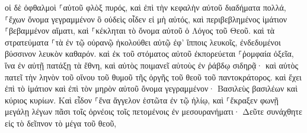 \documentclass{openreader}
\begin{document}
οἱ δὲ ὀφθαλμοὶ ⸀αὐτοῦ φλὸξ πυρός, καὶ ἐπὶ τὴν κεφαλὴν αὐτοῦ διαδήματα πολλά, ⸀ἔχων ὄνομα γεγραμμένον ὃ οὐδεὶς οἶδεν εἰ μὴ αὐτός, 
καὶ περιβεβλημένος ἱμάτιον ⸀βεβαμμένον αἵματι, καὶ ⸀κέκληται τὸ ὄνομα αὐτοῦ ὁ Λόγος τοῦ Θεοῦ. 
καὶ τὰ στρατεύματα ⸀τὰ ἐν τῷ οὐρανῷ ἠκολούθει αὐτῷ ἐφ’ ἵπποις λευκοῖς, ἐνδεδυμένοι βύσσινον λευκὸν καθαρόν. 
καὶ ἐκ τοῦ στόματος αὐτοῦ ἐκπορεύεται ⸀ῥομφαία ὀξεῖα, ἵνα ἐν αὐτῇ πατάξῃ τὰ ἔθνη, καὶ αὐτὸς ποιμανεῖ αὐτοὺς ἐν ῥάβδῳ σιδηρᾷ· καὶ αὐτὸς πατεῖ τὴν ληνὸν τοῦ οἴνου τοῦ θυμοῦ τῆς ὀργῆς τοῦ θεοῦ τοῦ παντοκράτορος. 
καὶ ἔχει ἐπὶ τὸ ἱμάτιον καὶ ἐπὶ τὸν μηρὸν αὐτοῦ ὄνομα γεγραμμένον· Βασιλεὺς βασιλέων καὶ κύριος κυρίων. 
Καὶ εἶδον ⸀ἕνα ἄγγελον ἑστῶτα ἐν τῷ ἡλίῳ, καὶ ⸀ἔκραξεν φωνῇ μεγάλῃ λέγων πᾶσι τοῖς ὀρνέοις τοῖς πετομένοις ἐν μεσουρανήματι· Δεῦτε συνάχθητε εἰς τὸ δεῖπνον τὸ μέγα τοῦ θεοῦ, 
\end{document}
